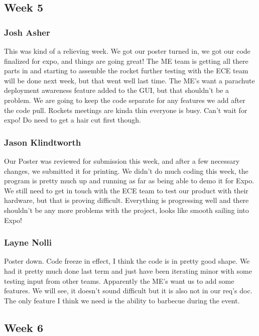 \documentclass[10pt,draftclsnofoot,onecolumn]{IEEEtran}
\begin{document}
\subsection{Week 5}
\subsubsection{Josh Asher}
This was kind of a relieving week. We got our poster turned in, we got our code finalized for expo, and things are going great! The ME team is getting all there parts in and starting to assemble the rocket further testing with the ECE team will be done next week, but that went well last time. The ME's want a parachute deployment awareness feature added to the GUI, but that shouldn't be a problem. We are going to keep the code separate for any features we add after the code pull. Rockets meetings are kinda thin everyone is busy. Can't wait for expo! Do need to get a hair cut first though. \par

\subsubsection{Jason Klindtworth}
Our Poster was reviewed for submission this week, and after a few necessary changes, we submitted it for printing. We didn't do much coding this week, the program is pretty much up and running as far as being able to demo it for Expo. We still need to get in touch with the ECE team to test our product with their hardware, but that is proving difficult. Everything is progressing well and there shouldn't be any more problems with the project, looks like smooth sailing into Expo! \par

\subsubsection{Layne Nolli}
Poster down. Code freeze in effect, I think the code is in pretty good shape. We had it pretty much done last term and just have been iterating minor with some testing input from other teams. Apparently the ME's want us to add some features. We will see, it doesn't sound difficult but it is also not in our req's doc. The only feature I think we need is the ability to barbecue during the event. \par

\subsection{Week 6}
\end{document}
